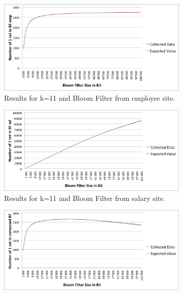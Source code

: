 \documentclass[12]{scrartcl}
\begin{document}
\begin{figure}[H]
	\begin{subfigure}[t]{\textwidth}
		\begin{center}
			\includegraphics[scale=0.3]{res/11-emp.png}
		\end{center}
		\caption{Results for k=11 and Bloom Filter from employee site.}
	\end{subfigure}
	\begin{subfigure}[t]{\textwidth}
		\begin{center}
			\includegraphics[scale=0.3]{res/11-sal.png}
		\end{center}
		\caption{Results for k=11 and Bloom Filter from salary site.}
	\end{subfigure}
	\begin{subfigure}[t]{\textwidth}
		\begin{center}
			\includegraphics[scale=0.3]{res/11-composed.png}

\end{center}
\end{subfigure}
\end{figure}
\end{document}
